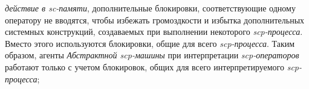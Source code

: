 {{		\textit{действие в sc-памяти}, дополнительные блокировки, соответствующие
		одному оператору не вводятся, чтобы избежать громоздкости и избытка
		дополнительных системных конструкций, создаваемых при выполнении
		некоторого \textit{scp-процесса}. Вместо этого используются блокировки, общие
		для всего \textit{scp-процесса}. Таким образом, агенты \textit{Абстрактной scp-машины}
		при интерпретации \textit{scp-операторов} работают только с учетом блокировок,
		общих для всего интерпретируемого \textit{scp-процесса}};
	}


